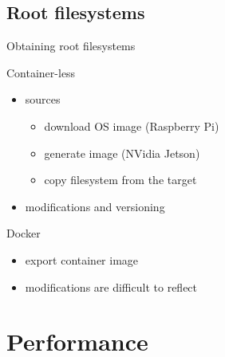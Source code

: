 \documentclass[hyperref={colorlinks=false, breaklinks=true},11pt]{beamer}
\begin{document}
\subsection{Root filesystems}
\begin{frame}{Obtaining root filesystems}
    \begin{block}{Container-less}
        \begin{itemize}
            \item sources
                \begin{itemize}
                    \item download OS image (Raspberry Pi)
                    \item generate image (NVidia Jetson)
                    \item copy filesystem from the target
                \end{itemize}
            \item modifications and versioning
        \end{itemize}
    \end{block}

    \begin{block}{Docker}
        \begin{itemize}
            \item export container image
            \item modifications are difficult to reflect
        \end{itemize}
    \end{block}
\end{frame}


\section{Performance}
\end{document}
